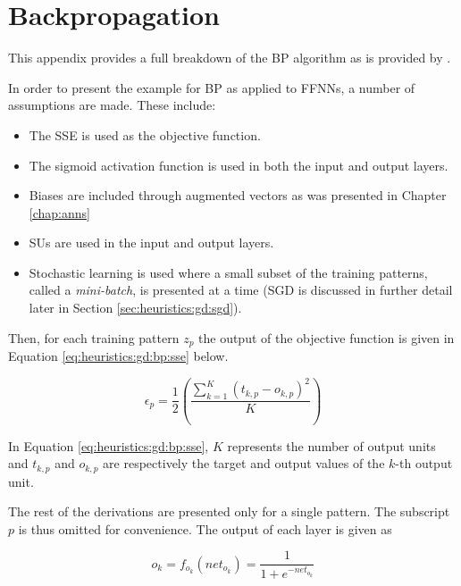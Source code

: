 \chapter{Backpropagation}\label{app:backpropagation}

This appendix provides a full breakdown of the \acs{BP} algorithm as is provided by \citeauthor{ref:engelbrecht:2007} \cite{ref:engelbrecht:2007}.

In order to present the example for \ac{BP} as applied to \acp{FFNN}, a number of assumptions are made. These include:

\begin{itemize}
      \item The \ac{SSE} is used as the objective function.
      \item The sigmoid activation function is used in both the input and output layers.
      \item Biases are included through augmented vectors as was presented in Chapter \ref{chap:anns}
      \item \Acp{SU} are used in the input and output layers.
      \item Stochastic learning is used where a small subset of the training patterns, called a \textit{mini-batch}, is presented at a time (\ac{SGD} is discussed in further detail later in Section \ref{sec:heuristics:gd:sgd}).
\end{itemize}

Then, for each training pattern $z_{p}$ the output of the objective function is given in Equation \ref{eq:heuristics:gd:bp:sse} below.

\begin{equation}
      \label{eq:heuristics:gd:bp:sse}
      \epsilon_{p} = \frac{1}{2}\left(\frac{\sum^{K}_{k=1}(t_{k,p} - o_{k,p})^{2}}{K}\right)
\end{equation}

In Equation \ref{eq:heuristics:gd:bp:sse}, $K$ represents the number of output units and $t_{k,p}$ and $o_{k,p}$ are respectively the target and output values of the $k$-th output unit.

The rest of the derivations are presented only for a single pattern. The subscript $p$ is thus omitted for convenience. The output of each layer is given as

\begin{equation}
      \label{eq:heuristics:gd:bp:output_1}
      o_{k} = f_{o_{k}}(net_{o_{k}}) = \frac{1}{1 + e^{-net_{o_{k}}}}
\end{equation}

